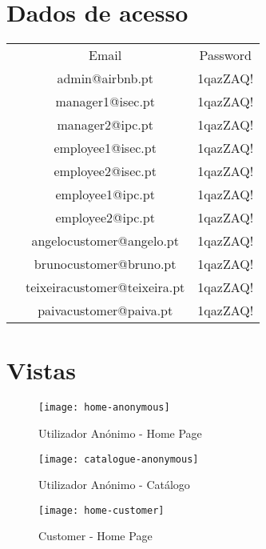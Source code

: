 \documentclass[11pt]{article}
\begin{document}
    \section{Dados de acesso}
	\normalsize        
	\begin{tabular}{ r|c|c| }
		\multicolumn{1}{r}{}
		&  \multicolumn{1}{c}{Email}
		& \multicolumn{1}{c}{Password} \\
		\cline{2-3}
		& admin@airbnb.pt & 1qazZAQ! \\
		\cline{2-3}
		& manager1@isec.pt & 1qazZAQ! \\
		\cline{2-3}
		& manager2@ipc.pt & 1qazZAQ! \\
		\cline{2-3}
		& employee1@isec.pt & 1qazZAQ! \\
		\cline{2-3}
		& employee2@isec.pt & 1qazZAQ! \\
		\cline{2-3}
		& employee1@ipc.pt & 1qazZAQ! \\
		\cline{2-3}
		& employee2@ipc.pt & 1qazZAQ! \\
		\cline{2-3}
		& angelocustomer@angelo.pt & 1qazZAQ! \\
		\cline{2-3}
		& brunocustomer@bruno.pt & 1qazZAQ! \\
		\cline{2-3}
		& teixeiracustomer@teixeira.pt & 1qazZAQ! \\
		\cline{2-3}
		& paivacustomer@paiva.pt & 1qazZAQ! \\
		\cline{2-3}
	\end{tabular}

	
	\newpage
	\vfill

    \large
    \section{Vistas}
    \normalsize
    
    \begin{figure}[!ht]
    	\texttt{[image: home-anonymous]}
    	\centering
    	\caption{Utilizador Anónimo - Home Page}
    	\label{fig:anonymous-home-page}
    \end{figure}

    \begin{figure}[!ht]
		\texttt{[image: catalogue-anonymous]}
		\centering
		\caption{Utilizador Anónimo - Catálogo}
		\label{fig:anonymous-catalogue}
	\end{figure}

	\begin{figure}[!ht]
		\texttt{[image: home-customer]}
		\centering
		\caption{Customer - Home Page}
		\label{fig:customer-home-page}
	\end{figure}
	
\end{document}

